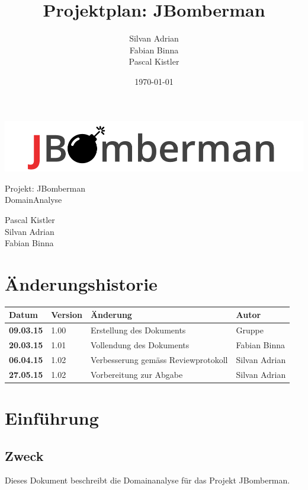 \documentclass[11pt]{scrartcl}
\title{Projektplan: JBomberman}
\author{Silvan Adrian \\ Fabian Binna \\ Pascal Kistler}
\date{\today{}}
\begin{document}
\def\arraystretch{1.5}
\begin{titlepage}
\begin{center}
\vspace{10em}
\includegraphics[scale=2]{jbomberman}
\vspace{10em}
\end{center}
\begin{center}
\huge {Projekt: JBomberman} \\
\huge {DomainAnalyse}
\end{center}
\begin{center}
\vspace{10em}
\LARGE {Pascal Kistler} \\
\LARGE {Silvan Adrian} \\
\LARGE {Fabian Binna}
\end{center}

\end{titlepage}

\newpage
\section{Änderungshistorie}
\label{sec:Änderungen}

\begin{tabularx}{\linewidth}{l l l l}
\textbf{Datum} & \textbf{Version} & \textbf{Änderung}  & \textbf{Autor} \\
\hline
\textbf{09.03.15} & 1.00 & Erstellung des Dokuments & Gruppe \\
\textbf{20.03.15} & 1.01 & Vollendung des Dokuments & Fabian Binna \\
\textbf{06.04.15} & 1.02 & Verbesserung gemäss Reviewprotokoll & Silvan Adrian \\
\textbf{27.05.15} & 1.02 & Vorbereitung zur Abgabe & Silvan Adrian\\
\end{tabularx}

\newpage
\tableofcontents
\newpage
\section{Einführung}
\label{sec:Einführung}

\subsection{Zweck}
\label{sec:Zweck}
Dieses Dokument beschreibt die Domainanalyse für das Projekt JBomberman.
\end{document}
